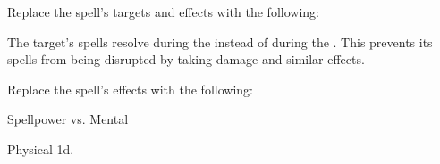 


Replace the spell's targets and effects with the following:
\begin{spellcontent}

\begin{augmenttargetinginfo}



\end{augmenttargetinginfo}


\begin{augmenteffects}



\spelleffect
The target's spells resolve during the  instead of during the .
This prevents its spells from being disrupted by taking damage and similar effects.








\end{augmenteffects}

\end{spellcontent}








Replace the spell's effects with the following:
\begin{spellcontent}

\begin{augmenteffects}




\begin{spellattack}{Spellpower vs. Mental}


\hit Physical  \plus1d.


\end{spellattack}





\end{augmenteffects}

\end{spellcontent}





